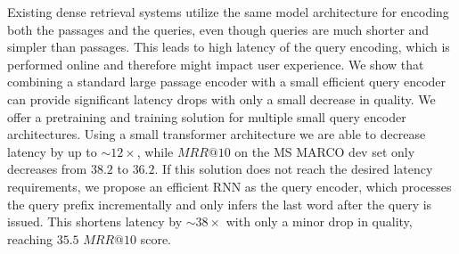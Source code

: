 Existing dense retrieval systems utilize the same model architecture for encoding both the passages and the queries, even though queries are much shorter and simpler than passages.  This leads to high latency of the query encoding, which is performed online and therefore might impact user experience.  We show that combining a standard large passage encoder with a small efficient query encoder can provide significant latency drops with only a small decrease in quality.  We offer a pretraining and training solution for multiple small query encoder architectures.  Using a small transformer architecture we are able to decrease latency by up to $\sim12\times$, while $MRR@10$ on the MS MARCO dev set only decreases from $38.2$ to $36.2$.  If this solution does not reach the desired latency requirements, we propose an efficient RNN as the query encoder, which processes the query prefix incrementally and only infers the last word after the query is issued.  This shortens latency by $\sim38\times$ with only a minor drop in quality, reaching $35.5$ $MRR@10$ score.